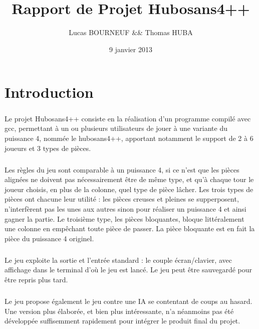 \documentclass{report}
\title{Rapport de Projet Hubosans4++}
\author{Lucas BOURNEUF \&\& Thomas HUBA}
\date{9 janvier 2013}
\begin{document}
\maketitle


\chapter*{Introduction}
    \paragraph*{}
        Le projet Hubosans4++ consiste en la réalisation d'un programme compilé avec gcc, permettant à un ou plusieurs utilisateurs de jouer à une variante du puissance 4, nommée le hubosans4++,
        apportant notamment le support de 2 à 6 joueurs et 3 types de pièces. 
    \paragraph*{}
        Les règles du jeu sont comparable à un puissance 4, si ce n'est que les pièces alignées ne doivent pas nécessairement être de même type, et qu'à chaque tour le joueur choisis, 
        en plus de la colonne, quel type de pièce lâcher. Les trois types de pièces ont chacune leur utilité : les pièces creuses et pleines se supperposent, 
        n'interfèrent pas les unes aux autres sinon pour réaliser un puissance 4 et ainsi gagner la partie. 
        Le troisième type, les pièces bloquantes, bloque littéralement une colonne en empêchant toute pièce de passer. La pièce bloquante est en fait la pièce du puissance 4 originel.
    \paragraph*{}
        Le jeu exploite la sortie et l'entrée standard : le couple écran/clavier, avec affichage dans le terminal d'où le jeu est lancé.
        Le jeu peut être sauvegardé pour être repris plus tard.
    \paragraph*{}
        Le jeu propose également le jeu contre une IA se contentant de coups au hasard. Une version plus élaborée, et bien plus intéressante, n'a néanmoins pas été développée
            suffisemment rapidement pour intégrer le produit final du projet.
\end{document}
